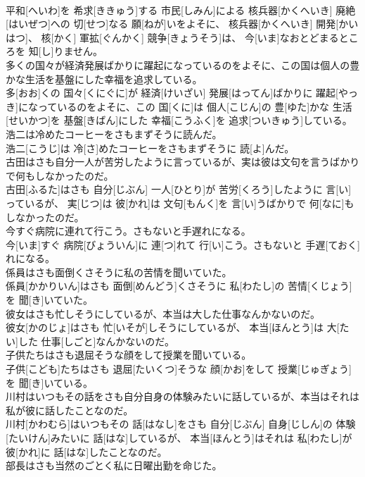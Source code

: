 \documentclass[8pt]{extreport}
\begin{document}
\begin{CJK}{UTF8}{min}
\\	平和[へいわ]を 希求[ききゅう]する 市民[しみん]による 核兵器[かくへいき] 廃絶[はいぜつ]への 切[せつ]なる 願[ねが]いをよそに、 核兵器[かくへいき] 開発[かいはつ]、 核[かく] 軍拡[ぐんかく] 競争[きょうそう]は、 今[いま]なおとどまるところを 知[し]りません。
\\	多くの国々が経済発展ばかりに躍起になっているのをよそに、この国は個人の豊かな生活を基盤にした幸福を追求している。	
\\	多[おお]くの 国々[くにぐに]が 経済[けいざい] 発展[はってん]ばかりに 躍起[やっき]になっているのをよそに、この 国[くに]は 個人[こじん]の 豊[ゆた]かな 生活[せいかつ]を 基盤[きばん]にした 幸福[こうふく]を 追求[ついきゅう]している。
\\	浩二は冷めたコーヒーをさもまずそうに読んだ。	
\\	浩二[こうじ]は 冷[さ]めたコーヒーをさもまずそうに 読[よ]んだ。
\\	古田はさも自分一人が苦労したように言っているが、実は彼は文句を言うばかりで何もしなかったのだ。	
\\	古田[ふるた]はさも 自分[じぶん] 一人[ひとり]が 苦労[くろう]したように 言[い]っているが、 実[じつ]は 彼[かれ]は 文句[もんく]を 言[い]うばかりで 何[なに]もしなかったのだ。
\\	今すぐ病院に連れて行こう。さもないと手遅れになる。	
\\	今[いま]すぐ 病院[びょういん]に 連[つ]れて 行[い]こう。さもないと 手遅[ておく]れになる。
\\	係員はさも面倒くさそうに私の苦情を聞いていた。	
\\	係員[かかりいん]はさも 面倒[めんどう]くさそうに 私[わたし]の 苦情[くじょう]を 聞[き]いていた。
\\	彼女はさも忙しそうにしているが、本当は大した仕事なんかないのだ。	
\\	彼女[かのじょ]はさも 忙[いそが]しそうにしているが、 本当[ほんとう]は 大[たい]した 仕事[しごと]なんかないのだ。
\\	子供たちはさも退屈そうな顔をして授業を聞いている。	
\\	子供[こども]たちはさも 退屈[たいくつ]そうな 顔[かお]をして 授業[じゅぎょう]を 聞[き]いている。
\\	川村はいつもその話をさも自分自身の体験みたいに話しているが、本当はそれは私が彼に話したことなのだ。	
\\	川村[かわむら]はいつもその 話[はなし]をさも 自分[じぶん] 自身[じしん]の 体験[たいけん]みたいに 話[はな]しているが、 本当[ほんとう]はそれは 私[わたし]が 彼[かれ]に 話[はな]したことなのだ。
\\	部長はさも当然のごとく私に日曜出勤を命じた。	

\end{CJK}
\end{document}
